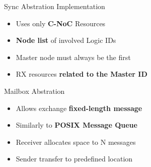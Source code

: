 		\begin{frame}[fragile]{Sync Abstration Implementation}
			\begin{itemize}
				\item Uses only \textbf{C-NoC} Resources
				\item \textbf{Node list} of involved Logic IDs
				\item Master node must always be the first
				\item RX resources \textbf{related to the Master ID}
			\end{itemize}


		\end{frame}

		\begin{frame}[fragile]{Mailbox Abstration}
			\begin{itemize}
				\item Allows exchange \textbf{fixed-length message}
				\item Similarly to \textbf{POSIX Message Queue}
				\item Receiver allocates space to N messages
				\item Sender transfer to predefined location
			\end{itemize}

	
		\end{frame}

